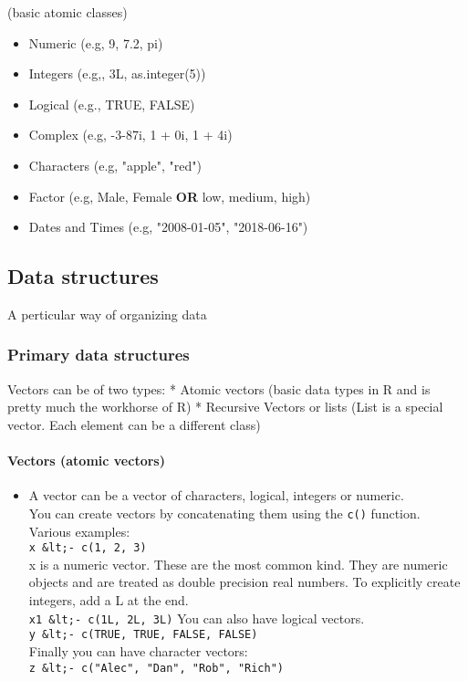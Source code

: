 \documentclass[11pt]{article}
\providecommand{\tightlist}{%
      \setlength{\itemsep}{0pt}\setlength{\parskip}{0pt}}
\begin{document}
(basic atomic classes)

    \begin{itemize}
\tightlist
\item
  Numeric (e.g, 9, 7.2, pi)
\item
  Integers (e.g,, 3L, as.integer(5))
\item
  Logical (e.g., TRUE, FALSE)
\item
  Complex (e.g, -3-87i, 1 + 0i, 1 + 4i)
\item
  Characters (e.g, "apple", "red")
\item
  Factor (e.g, Male, Female \textbf{OR} low, medium, high)
\item
  Dates and Times (e.g, "2008-01-05", "2018-06-16")
\end{itemize}

    \subsection{Data structures}\label{data-structures}

A perticular way of organizing data

    \subsubsection{Primary data structures}\label{primary-data-structures}

    Vectors can be of two types: * Atomic vectors (basic data types in R and
is pretty much the workhorse of R) * Recursive Vectors or lists (List is
a special vector. Each element can be a different class)

    \paragraph{Vectors (atomic vectors)}\label{vectors-atomic-vectors}

    \begin{itemize}
\tightlist
\item
  A vector can be a vector of characters, logical, integers or
  numeric.\\
  You can create vectors by concatenating them using the \texttt{c()}
  function.\\
  Various examples:\\
  \texttt{x\ \&lt;-\ c(1,\ 2,\ 3)}\\
  x is a numeric vector. These are the most common kind. They are
  numeric objects and are treated as double precision real numbers. To
  explicitly create integers, add a L at the end.\\
  \texttt{x1\ \&lt;-\ c(1L,\ 2L,\ 3L)} You can also have logical
  vectors.\\
  \texttt{y\ \&lt;-\ c(TRUE,\ TRUE,\ FALSE,\ FALSE)}\\
  Finally you can have character vectors:\\
  \texttt{z\ \&lt;-\ c("Alec",\ "Dan",\ "Rob",\ "Rich")}
\end{itemize}
\end{document}
